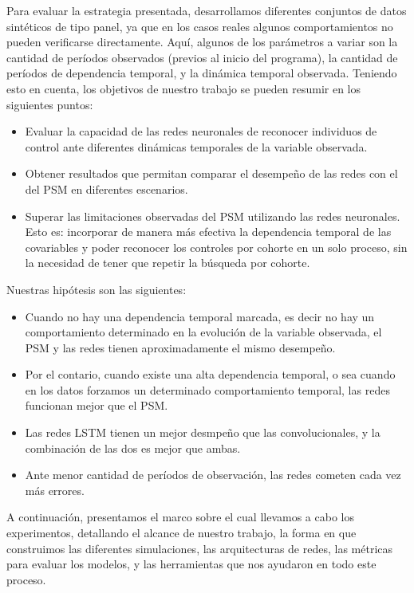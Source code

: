 \documentclass[../main.tex]{subfiles}
\begin{document}
Para evaluar la estrategia presentada, desarrollamos diferentes conjuntos de datos
sintéticos de tipo panel, ya que en los casos reales algunos comportamientos no pueden
verificarse directamente. Aquí, algunos de los parámetros a variar son la cantidad de
períodos observados (previos al inicio del programa), la cantidad de períodos de
dependencia temporal, y la dinámica temporal observada. Teniendo esto en cuenta, los
objetivos de nuestro trabajo se pueden resumir en los siguientes puntos:
\begin{itemize}
    \item Evaluar la capacidad de las redes neuronales de reconocer individuos de control
    ante diferentes dinámicas temporales de la variable observada.
    \item Obtener resultados que permitan comparar el desempeño de las redes con
    el del PSM en diferentes escenarios.
    \item Superar las limitaciones observadas del PSM utilizando las redes neuronales.
    Esto es: incorporar de manera más efectiva la dependencia temporal de las covariables
    y poder reconocer los controles por cohorte en un solo proceso, sin la necesidad de
    tener que repetir la búsqueda por cohorte.
\end{itemize}

Nuestras hipótesis son las siguientes:
\begin{itemize}
    \item Cuando no hay una dependencia temporal marcada, es decir no hay un
    comportamiento determinado en la evolución de la variable observada, el PSM y las
    redes tienen aproximadamente el mismo desempeño.
    \item Por el contario, cuando existe una alta dependencia temporal, o sea cuando en
    los datos forzamos un determinado comportamiento temporal, las redes funcionan mejor
    que el PSM.
    \item Las redes LSTM tienen un mejor desmpeño que las convolucionales, y la combinación
    de las dos es mejor que ambas.
    \item Ante menor cantidad de períodos de observación, las redes cometen cada
    vez más errores.
\end{itemize}

A continuación, presentamos el marco sobre el cual llevamos a cabo los experimentos,
detallando el alcance de nuestro trabajo, la forma en que construimos las diferentes
simulaciones, las arquitecturas de redes, las métricas para evaluar los modelos,
y las herramientas que nos ayudaron en todo este proceso.
\end{document}
